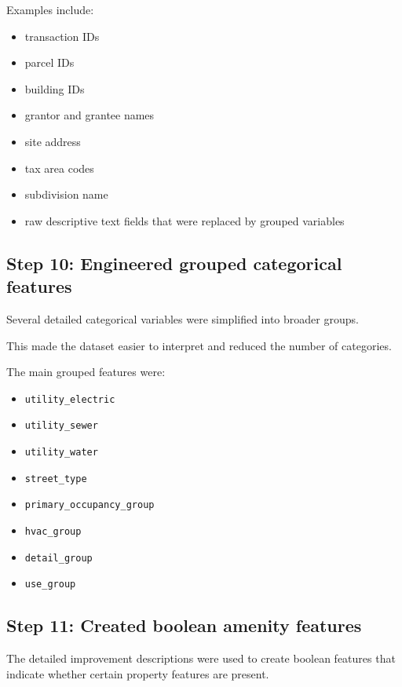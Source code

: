 \documentclass[
  english,
  letterpaper,
  DIV=11,
  numbers=noendperiod]{scrreprt}
\begin{document}
Examples include:

\begin{itemize}
\item
  transaction IDs
\item
  parcel IDs
\item
  building IDs
\item
  grantor and grantee names
\item
  site address
\item
  tax area codes
\item
  subdivision name
\item
  raw descriptive text fields that were replaced by grouped variables
\end{itemize}

\subsection{Step 10: Engineered grouped categorical
features}\label{step-10-engineered-grouped-categorical-features}

Several detailed categorical variables were simplified into broader
groups.

This made the dataset easier to interpret and reduced the number of
categories.

The main grouped features were:

\begin{itemize}
\item
  \texttt{utility\_electric}
\item
  \texttt{utility\_sewer}
\item
  \texttt{utility\_water}
\item
  \texttt{street\_type}
\item
  \texttt{primary\_occupancy\_group}
\item
  \texttt{hvac\_group}
\item
  \texttt{detail\_group}
\item
  \texttt{use\_group}
\end{itemize}

\subsection{Step 11: Created boolean amenity
features}\label{step-11-created-boolean-amenity-features}

The detailed improvement descriptions were used to create boolean
features that indicate whether certain property features are present.
\end{document}
